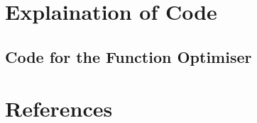 \section{Explaination of Code}

\subsection{Code for the Function Optimiser}

\section{References}
\printbibliography[omitnumbers = false]